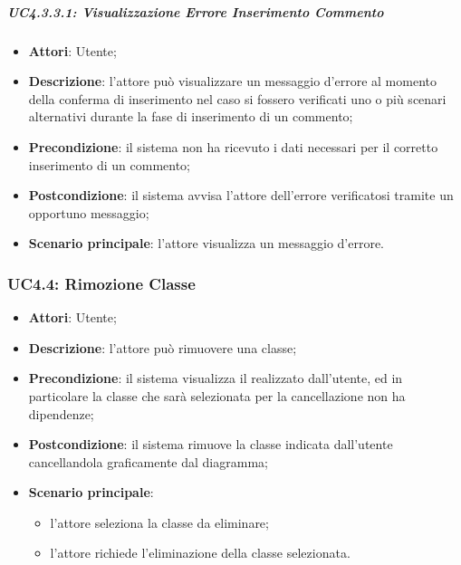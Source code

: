 \subparagraph{UC4.3.3.1: Visualizzazione Errore Inserimento Commento}
\label{UC4.3.3.1}
\begin{itemize}
\item \textbf{Attori}: Utente;
\item \textbf{Descrizione}: l'attore può visualizzare un messaggio d'errore al momento della conferma di inserimento nel caso si fossero verificati uno o più scenari alternativi durante la fase di inserimento di un commento;	
\item \textbf{Precondizione}: il sistema non ha ricevuto i dati necessari per il corretto inserimento di un commento;	
\item \textbf{Postcondizione}: il sistema avvisa l'attore dell'errore verificatosi tramite un opportuno messaggio;	
\item \textbf{Scenario principale}:
l'attore visualizza un messaggio d'errore.	
\end{itemize}

\subsubsection{UC4.4: Rimozione Classe}
\label{UC4.4}
\begin{itemize}
\item \textbf{Attori}: Utente;
\item \textbf{Descrizione}: l'attore può rimuovere una classe;
\item \textbf{Precondizione}: il sistema visualizza il  realizzato dall'utente, ed in particolare la classe che sarà selezionata per la cancellazione non ha dipendenze;
\item \textbf{Postcondizione}: il sistema rimuove la classe indicata dall'utente cancellandola graficamente dal diagramma;
\item \textbf{Scenario principale}:
\begin{itemize}
	\item l'attore seleziona la classe da eliminare;
	\item l'attore richiede l'eliminazione della classe selezionata.
\end{itemize}
\end{itemize}

